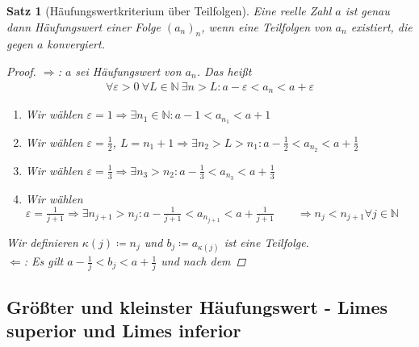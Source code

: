 \documentclass[11pt, twoside, a4paper]{article}
\theoremstyle{plain}
\newtheorem{satz}[blockelement]{Satz}
\newcommand{\pair}[1]{\left(#1\right)}
\newcommand{\impl}[0]{\Rightarrow{}}
\newcommand{\definedas}[0]{\coloneqq}
\newcommand{\anf}[1]{\glqq{}#1\grqq}
\newcommand{\naturalnumbers}{\mathbb{N}}
\begin{document}
    \begin{satz}[Häufungswertkriterium über Teilfolgen]
        \label{satz:haeufungswert-teilfolge}
        Eine reelle Zahl $a$ ist genau dann Häufungswert einer Folge $(a_n)_n$, wenn eine Teilfolgen von $a_n$ existiert, die gegen $a$ konvergiert.

        \begin{proof}
            \anf{$\impl$}: $a$ sei Häufungswert von $a_n$. Das heißt
            \begin{align*}
                \forall \varepsilon > 0~\forall L\in\naturalnumbers~\exists n>L\colon a-\varepsilon < a_n < a+\varepsilon
            \end{align*}
            \begin{enumerate}[label=\arabic*)]
                \item Wir wählen $\varepsilon = 1 \impl \exists n_1\in\naturalnumbers\colon a-1 < a_{n_1} < a+1$
                \item Wir wählen $\varepsilon = \frac{1}{2}$, $L=n_1 + 1 \impl \exists n_2 > L > n_1\colon a-\frac{1}{2} < a_{n_2} < a + \frac{1}{2}$
                \item Wir wählen $\varepsilon = \frac{1}{3} \impl \exists n_3 > n_2\colon a - \frac{1}{3} < a_{n_3} < a + \frac{1}{3}$
                \item[$j$)] Wir wählen $\varepsilon = \frac{1}{j+1} \impl \exists n_{j+1} > n_j\colon a-\frac{1}{j+1} < a_{n_{j+1}} < a + \frac{1}{j+1}\qquad \impl n_j < n_{j+1} \forall j \in \naturalnumbers$
            \end{enumerate}
            \noindent Wir definieren $\kappa\pair{j} \definedas n_j$ und $b_j \definedas a_{\kappa(j)}$ ist eine Teilfolge.\\
            \anf{$\Leftarrow$}: Es gilt $a-\frac{1}{j} < b_j < a + \frac{1}{j}$ und nach dem
        \end{proof}
    \end{satz}

    \newpage


    \subsection{Größter und kleinster Häufungswert - Limes superior und Limes inferior}
\end{document}
